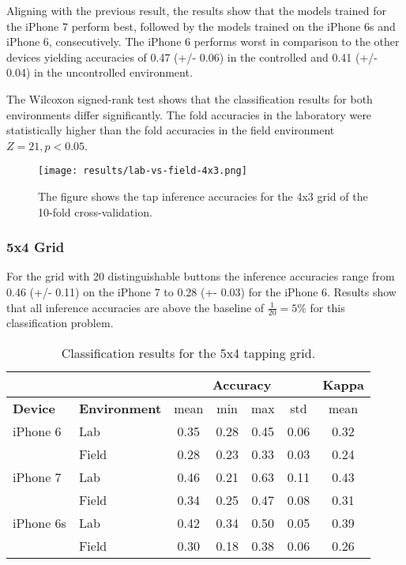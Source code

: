 Aligning with the previous result, the results show that the models trained for the iPhone 7 perform best, followed by the models trained on the iPhone 6s and iPhone 6, consecutively. The iPhone 6 performs worst in comparison to the other devices yielding accuracies of 0.47 (+/- 0.06) in the controlled and 0.41 (+/- 0.04) in the uncontrolled environment.

The Wilcoxon signed-rank test shows that the classification results for both environments differ significantly. The fold accuracies in the laboratory were statistically higher than the fold accuracies in the field environment $Z = 21, p < 0.05$.

\begin{figure}[h!]
  \centering
  \texttt{[image: results/lab-vs-field-4x3.png]}
  \caption{The figure shows the tap inference accuracies for the 4x3 grid of the 10-fold cross-validation.} \label{fig:participation}
\end{figure}

\subsubsection{5x4 Grid}
For the grid with 20 distinguishable buttons the inference accuracies range from 0.46 (+/- 0.11) on the iPhone 7 to 0.28 (+- 0.03) for the iPhone 6. Results show that all inference accuracies are above the baseline of $\frac{1}{20} = 5\%$ for this classification problem.

\begin{table}[h!]
  \centering
\begin{tabular}{|l|l|c|c|c|c|c|}
  \cline{3-7}
  \multicolumn{2}{c}{} & \multicolumn{4}{|c|}{\textbf{Accuracy}} & \textbf{Kappa} \\
  \hline
  \textbf{Device} & \textbf{Environment} & mean &   min &   max  & std &  mean \\
  \hline
  iPhone 6 & Lab &      0.35 &     0.28 &     0.45 &     0.06 &        0.32 \\
  & Field &      0.28 &     0.23 &     0.33 &     0.03 &        0.24 \\
  \hline
iPhone 7 & Lab &      0.46 &     0.21 &     0.63 &     0.11 &        0.43 \\
  & Field &      0.34 &     0.25 &     0.47 &     0.08 &        0.31 \\
  \hline
iPhone 6s & Lab &      0.42 &     0.34 &     0.50 &     0.05 &        0.39 \\
  & Field &      0.30 &     0.18 &     0.38 &     0.06 &        0.26 \\
  \hline
\end{tabular}
  \caption{Classification results for the 5x4 tapping grid.}
\end{table}

